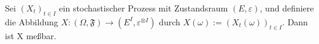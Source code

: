 Sei $(X_{t})_{t\in I}$ ein stochastischer Prozess mit Zustandsraum $(E,\varepsilon)$, und definiere die Abbildung $X:(\Omega,\mathfrak{F}) \to (E^{I},\varepsilon^{ \otimes I})$ durch $X(\omega) := (X_{t}(\omega))_{t\in I} $. 
Dann ist X meßbar. 